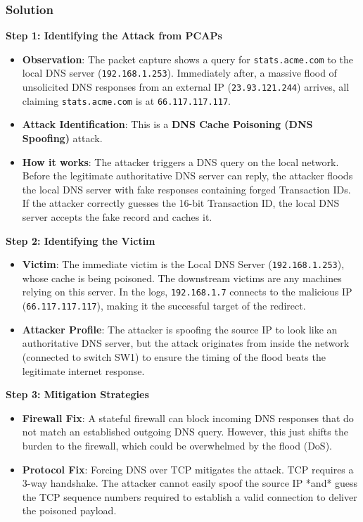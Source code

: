 \documentclass{article}
\begin{document}
\subsubsection*{Solution}
\textbf{Step 1: Identifying the Attack from PCAPs}
\begin{itemize}
    \item \textbf{Observation}: The packet capture shows a query for \texttt{stats.acme.com} to the local DNS server (\texttt{192.168.1.253}). Immediately after, a massive flood of unsolicited DNS responses from an external IP (\texttt{23.93.121.244}) arrives, all claiming \texttt{stats.acme.com} is at \texttt{66.117.117.117}.
    \item \textbf{Attack Identification}: This is a \textbf{DNS Cache Poisoning (DNS Spoofing)} attack.
    \item \textbf{How it works}: The attacker triggers a DNS query on the local network. Before the legitimate authoritative DNS server can reply, the attacker floods the local DNS server with fake responses containing forged Transaction IDs. If the attacker correctly guesses the 16-bit Transaction ID, the local DNS server accepts the fake record and caches it.

\end{itemize}
\textbf{Step 2: Identifying the Victim}
\begin{itemize}
    \item \textbf{Victim}: The immediate victim is the Local DNS Server (\texttt{192.168.1.253}), whose cache is being poisoned. The downstream victims are any machines relying on this server. In the logs, \texttt{192.168.1.7} connects to the malicious IP (\texttt{66.117.117.117}), making it the successful target of the redirect.
    \item \textbf{Attacker Profile}: The attacker is spoofing the source IP to look like an authoritative DNS server, but the attack originates from inside the network (connected to switch SW1) to ensure the timing of the flood beats the legitimate internet response.

\end{itemize}
\textbf{Step 3: Mitigation Strategies}
\begin{itemize}
    \item \textbf{Firewall Fix}: A stateful firewall can block incoming DNS responses that do not match an established outgoing DNS query. However, this just shifts the burden to the firewall, which could be overwhelmed by the flood (DoS).
    \item \textbf{Protocol Fix}: Forcing DNS over TCP mitigates the attack. TCP requires a 3-way handshake. The attacker cannot easily spoof the source IP *and* guess the TCP sequence numbers required to establish a valid connection to deliver the poisoned payload.
\end{itemize}
\end{document}
